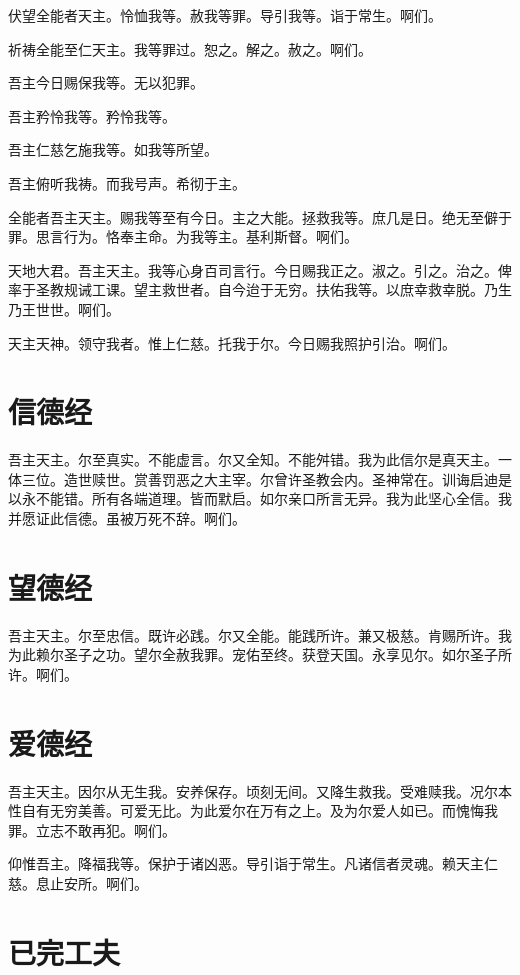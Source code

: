 \documentclass[UTF8,17pt]{ctexart}
\begin{document}
伏望全能者天主。怜恤我等。赦我等罪。导引我等。诣于常生。啊们。

祈祷全能至仁天主。我等罪过。恕之。解之。赦之。啊们。

吾主今日赐保我等。无以犯罪。

吾主矜怜我等。矜怜我等。

吾主仁慈乞施我等。如我等所望。

吾主俯听我祷。而我号声。希彻于主。

全能者吾主天主。赐我等至有今日。主之大能。拯救我等。庶几是日。绝无至僻于罪。思言行为。恪奉主命。为我等主。基利斯督。啊们。

天地大君。吾主天主。我等心身百司言行。今日赐我正之。淑之。引之。治之。俾率于圣教规诫工课。望主救世者。自今迨于无穷。扶佑我等。以庶幸救幸脱。乃生乃王世世。啊们。

天主天神。领守我者。惟上仁慈。托我于尔。今日赐我照护引治。啊们。

\section{信德经}
\label{xin-de-jing}

吾主天主。尔至真实。不能虚言。尔又全知。不能舛错。我为此信尔是真天主。一体三位。造世赎世。赏善罚恶之大主宰。尔曾许圣教会内。圣神常在。训诲启迪是以永不能错。所有各端道理。皆而默启。如尔亲口所言无异。我为此坚心全信。我并愿证此信德。虽被万死不辞。啊们。

\section{望德经}
\label{wang-de-jing}

吾主天主。尔至忠信。既许必践。尔又全能。能践所许。兼又极慈。肯赐所许。我为此赖尔圣子之功。望尔全赦我罪。宠佑至终。获登天国。永享见尔。如尔圣子所许。啊们。

\section{爱德经}
\label{ai-de-jing}

吾主天主。因尔从无生我。安养保存。顷刻无间。又降生救我。受难赎我。况尔本性自有无穷美善。可爱无比。为此爱尔在万有之上。及为尔爱人如已。而愧悔我罪。立志不敢再犯。啊们。

仰惟吾主。降福我等。保护于诸凶恶。导引诣于常生。凡诸信者灵魂。赖天主仁慈。息止安所。啊们。

\section{已完工夫}
\label{yi-wan-gong-fu}
\end{document}

